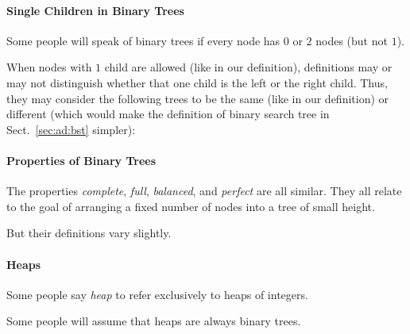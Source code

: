 \paragraph{Single Children in Binary Trees}
Some people will speak of binary trees if every node has $0$ or $2$ nodes (but not $1$).

When nodes with $1$ child are allowed (like in our definition), definitions may or may not distinguish whether that one child is the left or the right child.
Thus, they may consider the following trees to be the same (like in our definition) or different (which would make the definition of binary search tree in Sect.~\ref{sec:ad:bst} simpler):

\begin{center}
\tb
{}
\end{center}

\paragraph{Properties of Binary Trees}
The properties \emph{complete}, \emph{full}, \emph{balanced}, and \emph{perfect} are all similar.
They all relate to the goal of arranging a fixed number of nodes into a tree of small height.

But their definitions vary slightly.

\paragraph{Heaps}
Some people say \emph{heap} to refer exclusively to heaps of integers.

Some people will assume that heaps are always binary trees.

%

